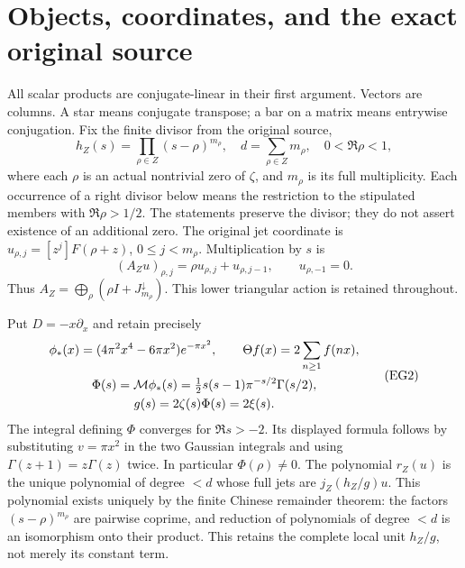 \documentclass[11pt]{article}
\begin{document}
\section{Objects, coordinates, and the exact original source}\label{eg:sec:objects}
All scalar products are conjugate-linear in their first argument. Vectors
are columns. A star means conjugate transpose; a bar on a matrix means
entrywise conjugation. Fix the finite divisor from the original source,
\[
 h_Z(s)=\prod_{\rho\in Z}(s-\rho)^{m_\rho},\quad
 d=\sum_{\rho\in Z}m_\rho,\quad 0<\Re\rho<1,
\]
where each $\rho$ is an actual nontrivial zero of $\zeta$, and $m_\rho$
is its full multiplicity. Each occurrence of a right divisor below means
the restriction to the stipulated members with $\Re\rho>1/2$. The
statements preserve the divisor; they do not assert existence of an
additional zero. The original jet coordinate is
$u_{\rho,j}=[z^j]F(\rho+z)$, $0\le j<m_\rho$. Multiplication by $s$ is
\[
 (A_Zu)_{\rho,j}=\rho u_{\rho,j}+u_{\rho,j-1},\qquad u_{\rho,-1}=0.
 \tag{EG1}\label{eg:eq:jet-action}
\]
Thus $A_Z=\bigoplus_\rho(\rho I+J^\downarrow_{m_\rho})$.
This lower triangular action is retained throughout.

Put $D=-x\partial_x$ and retain precisely
\[
 \begin{gathered}
 \phi_*(x)=(4\pi^2x^4-6\pi x^2)e^{-\pi x^2},\qquad
 \Theta f(x)=2\sum_{n\ge1}f(nx),\\
 \Phi(s)=\mathcal M\phi_*(s)=\tfrac12s(s-1)\pi^{-s/2}\Gamma(s/2),\\
 g(s)=2\zeta(s)\Phi(s)=2\xi(s).
 \end{gathered}
 \tag{EG2}\label{eg:eq:source}
\]
The integral defining $\Phi$ converges for $\Re s>-2$. Its displayed
formula follows by substituting $v=\pi x^2$ in the two Gaussian
integrals and using $\Gamma(z+1)=z\Gamma(z)$ twice. In particular
$\Phi(\rho)\ne0$. The polynomial $r_Z(u)$ is the unique polynomial of
degree $<d$ whose full jets are $j_Z(h_Z/g)u$. This polynomial exists
uniquely by the finite Chinese remainder theorem: the factors
$(s-\rho)^{m_\rho}$ are pairwise coprime, and reduction of polynomials
of degree $<d$ is an isomorphism onto their product. This retains the
complete local unit $h_Z/g$, not merely its constant term.
\end{document}
